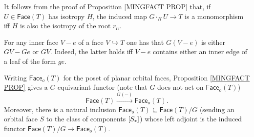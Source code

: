 \documentclass[a4paper,10pt
,draft
]{article}%
\begin{document}
\begin{remark}
	It follows from the proof of 
	Proposition \ref{MINGFACT PROP}
	that, if $U \in \mathsf{Face}(T)$ has isotropy $H$,
	the induced map 
	$G \cdot_H U \to T$ is a monomorphism iff
	$H$ is also the isotropy of the root $r_U$.
\end{remark}


\begin{remark}\label{GINNER REM}
	For any inner face $V-e$ 
	of a face $V \hookrightarrow T$ one has 
	that $G(V-e)$ is either $GV - Ge$ or $GV$.
	Indeed, the latter holds iff $V-e$ contains either an inner edge of a leaf of the form $ge$.
\end{remark}


\begin{remark}
Writing $\mathsf{Face}_o(T)$ for the poset of planar orbital faces, Proposition \ref{MINGFACT PROP} gives a $G$-equivariant functor (note that $G$ does not act on $\mathsf{Face}_o(T)$)
\[
	\mathsf{Face}(T) \xrightarrow{G(-)} \mathsf{Face}_o(T).
\]
Moreover, there is a natural inclusion
$\mathsf{Face}_o(T) \subseteq \mathsf{Face}(T)/G$ (sending an orbital face $S$ to the class of components $[S_{\**}]$)
whose left adjoint is the induced functor 
$\mathsf{Face}(T)/G \to \mathsf{Face}_o(T)$.
\end{remark}
\end{document}
